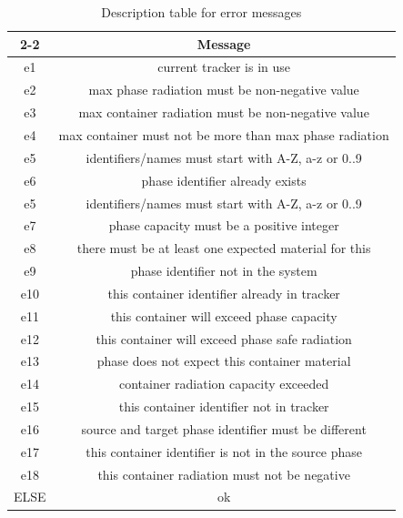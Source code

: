 \begin{table}[h]
\centering
\begin{tabular}{|c|c|}
	\cline{2-2}
	\multicolumn{1}{ c| }{ } & \textbf{Message} \\ \hline
	e1 & current tracker is in use \\ \hline
	e2 & max phase radiation must be non-negative value \\ \hline
	e3 & max container radiation must be non-negative value \\ \hline
	e4 & max container must not be more than max phase radiation \\ \hline
	e5 & identifiers/names must start with A-Z, a-z or 0..9 \\ \hline
    e6 & phase identifier already exists \\ \hline
    e5 & identifiers/names must start with A-Z, a-z or 0..9 \\ \hline
    e7 & phase capacity must be a positive integer \\ \hline
    e8 & there must be at least one expected material for this \\ \hline
    e9 & phase identifier not in the system \\ \hline
    e10 & this container identifier already in tracker \\ \hline
    e11 & this container will exceed phase capacity \\ \hline
    e12 & this container will exceed phase safe radiation \\ \hline
    e13 & phase does not expect this container material \\ \hline
    e14 & container radiation capacity exceeded \\ \hline
    e15 & this container identifier not in tracker \\ \hline
    e16 & source and target phase identifier must be different \\ \hline
    e17 & this container identifier is not in the source phase \\ \hline
    e18 & this container radiation must not be negative \\ \hline
    ELSE & ok \\ \hline
\end{tabular}
\caption {Description table for error messages}
\label{tbl:err}
\end{table}



\newpage
